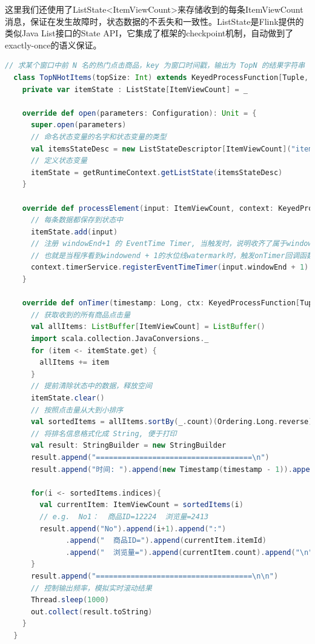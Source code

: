 \documentclass[oneside]{ctexbook}
\begin{document}
这里我们还使用了ListState<ItemViewCount>来存储收到的每条ItemViewCount消息，保证在发生故障时，状态数据的不丢失和一致性。ListState是Flink提供的类似Java List接口的State API，它集成了框架的checkpoint机制，自动做到了exactly-once的语义保证。

\begin{lstlisting}[language=scala]
  // 求某个窗口中前 N 名的热门点击商品，key 为窗口时间戳，输出为 TopN 的结果字符串
  class TopNHotItems(topSize: Int) extends KeyedProcessFunction[Tuple, ItemViewCount, String] {
    private var itemState : ListState[ItemViewCount] = _

    override def open(parameters: Configuration): Unit = {
      super.open(parameters)
      // 命名状态变量的名字和状态变量的类型
      val itemsStateDesc = new ListStateDescriptor[ItemViewCount]("itemState-state", classOf[ItemViewCount])
      // 定义状态变量
      itemState = getRuntimeContext.getListState(itemsStateDesc)
    }

    override def processElement(input: ItemViewCount, context: KeyedProcessFunction[Tuple, ItemViewCount, String]#Context, collector: Collector[String]): Unit = {
      // 每条数据都保存到状态中
      itemState.add(input)
      // 注册 windowEnd+1 的 EventTime Timer, 当触发时，说明收齐了属于windowEnd窗口的所有商品数据
      // 也就是当程序看到windowend + 1的水位线watermark时，触发onTimer回调函数
      context.timerService.registerEventTimeTimer(input.windowEnd + 1)
    }

    override def onTimer(timestamp: Long, ctx: KeyedProcessFunction[Tuple, ItemViewCount, String]#OnTimerContext, out: Collector[String]): Unit = {
      // 获取收到的所有商品点击量
      val allItems: ListBuffer[ItemViewCount] = ListBuffer()
      import scala.collection.JavaConversions._
      for (item <- itemState.get) {
        allItems += item
      }
      // 提前清除状态中的数据，释放空间
      itemState.clear()
      // 按照点击量从大到小排序
      val sortedItems = allItems.sortBy(_.count)(Ordering.Long.reverse).take(topSize)
      // 将排名信息格式化成 String, 便于打印
      val result: StringBuilder = new StringBuilder
      result.append("====================================\n")
      result.append("时间: ").append(new Timestamp(timestamp - 1)).append("\n")

      for(i <- sortedItems.indices){
        val currentItem: ItemViewCount = sortedItems(i)
        // e.g.  No1：  商品ID=12224  浏览量=2413
        result.append("No").append(i+1).append(":")
              .append("  商品ID=").append(currentItem.itemId)
              .append("  浏览量=").append(currentItem.count).append("\n")
      }
      result.append("====================================\n\n")
      // 控制输出频率，模拟实时滚动结果
      Thread.sleep(1000)
      out.collect(result.toString)
    }
  }
\end{lstlisting}
\end{document}
